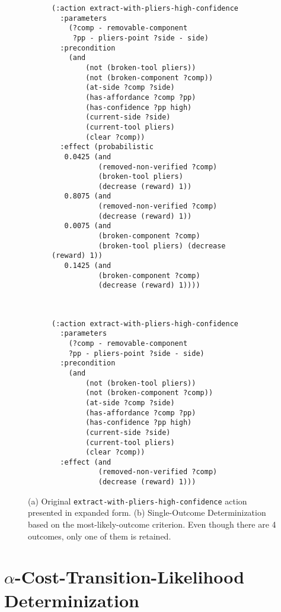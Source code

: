 \documentclass[../root.tex]{subfiles}
\begin{document}
\begin{figure}[tbhp]
\centering
\begin{subfigure}[m]{0.48\columnwidth}
\begin{lstlisting}[numbers=none]
(:action extract-with-pliers-high-confidence
  :parameters
    (?comp - removable-component
     ?pp - pliers-point ?side - side)
  :precondition
    (and
        (not (broken-tool pliers))
        (not (broken-component ?comp))
        (at-side ?comp ?side)
        (has-affordance ?comp ?pp)
        (has-confidence ?pp high)
        (current-side ?side)
        (current-tool pliers)
        (clear ?comp))
  :effect (probabilistic
   0.0425 (and
           (removed-non-verified ?comp)
           (broken-tool pliers)
           (decrease (reward) 1))
   0.8075 (and
           (removed-non-verified ?comp)
           (decrease (reward) 1))
   0.0075 (and
           (broken-component ?comp)
           (broken-tool pliers) (decrease (reward) 1))
   0.1425 (and
           (broken-component ?comp)
           (decrease (reward) 1))))
\end{lstlisting}
\caption{}
\label{fig:pliers-action}
\end{subfigure}
~
\begin{subfigure}[m]{0.48\columnwidth}
\begin{lstlisting}[numbers=none]
(:action extract-with-pliers-high-confidence
  :parameters
    (?comp - removable-component
    ?pp - pliers-point ?side - side)
  :precondition
    (and
        (not (broken-tool pliers))
        (not (broken-component ?comp))
        (at-side ?comp ?side)
        (has-affordance ?comp ?pp)
        (has-confidence ?pp high)
        (current-side ?side)
        (current-tool pliers)
        (clear ?comp))
  :effect (and
           (removed-non-verified ?comp)
           (decrease (reward) 1)))
\end{lstlisting}
\caption{}
\label{fig:pliers-action-determinized}
\end{subfigure}
\caption{(a) Original \texttt{extract-with-pliers-high-confidence}
	action presented in expanded form.
	(b) Single-Outcome Determinization based on the most-likely-outcome criterion.
	Even though there are 4 outcomes, only one of them is retained.}
\label{fig:single-outcome-pliers}
\end{figure}

\section{$\alpha$-Cost-Transition-Likelihood Determinization}
\end{document}
